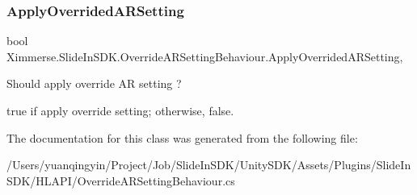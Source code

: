 \subsubsection{\texorpdfstring{Apply\+Overrided\+A\+R\+Setting}{ApplyOverridedARSetting}}
{\footnotesize\ttfamily bool Ximmerse.\+Slide\+In\+S\+D\+K.\+Override\+A\+R\+Setting\+Behaviour.\+Apply\+Overrided\+A\+R\+Setting\hspace{0.3cm}{\ttfamily [get]}, {\ttfamily [set]}}



Should apply override AR setting ? 

{\ttfamily true} if apply override setting; otherwise, {\ttfamily false}.

The documentation for this class was generated from the following file\+:\begin{DoxyCompactItemize}
\item 
/\+Users/yuanqingyin/\+Project/\+Job/\+Slide\+In\+S\+D\+K/\+Unity\+S\+D\+K/\+Assets/\+Plugins/\+Slide\+In\+S\+D\+K/\+H\+L\+A\+P\+I/Override\+A\+R\+Setting\+Behaviour.\+cs\end{DoxyCompactItemize}
